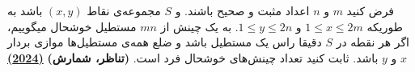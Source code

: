 فرض کنید $m$ و $n$ اعداد مثبت و صحیح باشند. و $S$ ‌مجموعه‌ی نقاط $(x, y)$ باشد به طوریکه
$1 \le x \le 2m$ و $1 \le y \le 2n$. به یک چینش از $mn$ مستطیل خوشحال میگوییم، اگر هر نقطه در $S$ دقیقا
راس یک مستطیل باشد و ضلع همه‌ی مستطیل‌ها موازی بردار $x$ و $y$ باشد.
ثابت کنید تعداد چینش‌های خوشحال فرد است.
\textbf{(تناظر، شمارش)}
\href{https://artofproblemsolving.com/community/c5h3281032p30216444}{\textbf{(2024)}}